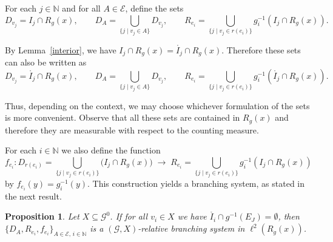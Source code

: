 \documentclass[12pt, reqno]{amsart}
\newtheorem{proposition}[theorem]{Proposition}
\theoremstyle{definition}
\theoremstyle{remark}
\numberwithin{equation}{section}
\begin{document}
For each $j \in \mathbb{N}$ and for all $A \in \mathcal{E}$, define the sets
\[
D_{v_j} = I_j \cap R_g(x), 
\qquad 
D_A = \bigcup_{\{j \mid v_j \in A\}} D_{v_j}, 
\qquad 
R_{e_i} = \bigcup_{\{j \mid v_j \in r(e_i)\}} g_i^{-1}(I_j \cap R_g(x)).
\]

By Lemma~\ref{interior}, we have 
$I_j \cap R_g(x) = \mathring{I_j} \cap R_g(x)$.  
Therefore these sets can also be written as
\[
D_{v_j} = \mathring{I_j} \cap R_g(x), 
\qquad 
D_A = \bigcup_{\{j \mid v_j \in A\}} D_{v_j}, 
\qquad 
R_{e_i} = \bigcup_{\{j \mid v_j \in r(e_i)\}} g_i^{-1}(\mathring{I_j} \cap R_g(x)).
\]


Thus, depending on the context, we may choose whichever formulation of the sets 
is more convenient. 
Observe that all these sets are contained in $R_g(x)$ and therefore they are 
measurable with respect to the counting measure.  

For each $i \in \mathbb{N}$ we also define the function
\[
f_{e_i} \colon 
D_{r(e_i)} 
   = \bigcup_{\{j \mid v_j \in r(e_i)\}} \bigl(I_j \cap R_g(x)\bigr) 
   \;\longrightarrow\; 
R_{e_i} 
   = \bigcup_{\{j \mid v_j \in r(e_i)\}} g_i^{-1}(I_j \cap R_g(x))
\]
by $
f_{e_i}(y) = g_i^{-1}(y).
$
This construction yields a branching system, as stated in the next result.

\begin{proposition}\label{markovmapsinducesbs}
    Let $X \subseteq \mathcal{G}^0$. 
    If for all $v_i \in X$ we have 
    $\mathring{I_i} \cap g^{-1}(E_J) = \emptyset$, 
    then $
    \{D_A, R_{e_i}, f_{e_i}\}_{A \in \mathcal{E},\, i \in \mathbb{N}} $
    is a $(\mathcal{G},X)$-relative branching system in $\ell^2(R_g(x))$.
\end{proposition}
\end{document}

